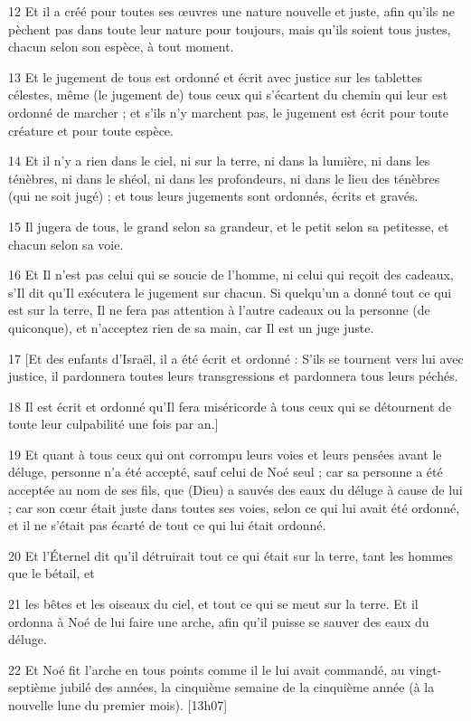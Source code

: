 \par 12 Et il a créé pour toutes ses œuvres une nature nouvelle et juste, afin qu'ils ne pèchent pas dans toute leur nature pour toujours, mais qu'ils soient tous justes, chacun selon son espèce, à tout moment.
\par 13 Et le jugement de tous est ordonné et écrit avec justice sur les tablettes célestes, même (le jugement de) tous ceux qui s'écartent du chemin qui leur est ordonné de marcher ; et s'ils n'y marchent pas, le jugement est écrit pour toute créature et pour toute espèce.
\par 14 Et il n'y a rien dans le ciel, ni sur la terre, ni dans la lumière, ni dans les ténèbres, ni dans le shéol, ni dans les profondeurs, ni dans le lieu des ténèbres (qui ne soit jugé) ; et tous leurs jugements sont ordonnés, écrits et gravés.
\par 15 Il jugera de tous, le grand selon sa grandeur, et le petit selon sa petitesse, et chacun selon sa voie.
\par 16 Et Il n'est pas celui qui se soucie de l'homme, ni celui qui reçoit des cadeaux, s'Il dit qu'Il exécutera le jugement sur chacun. Si quelqu'un a donné tout ce qui est sur la terre, Il ne fera pas attention à l'autre cadeaux ou la personne (de quiconque), et n'acceptez rien de sa main, car Il est un juge juste.
\par 17 [Et des enfants d'Israël, il a été écrit et ordonné : S'ils se tournent vers lui avec justice, il pardonnera toutes leurs transgressions et pardonnera tous leurs péchés.
\par 18 Il est écrit et ordonné qu'Il fera miséricorde à tous ceux qui se détournent de toute leur culpabilité une fois par an.]
\par 19 Et quant à tous ceux qui ont corrompu leurs voies et leurs pensées avant le déluge, personne n'a été accepté, sauf celui de Noé seul ; car sa personne a été acceptée au nom de ses fils, que (Dieu) a sauvés des eaux du déluge à cause de lui ; car son cœur était juste dans toutes ses voies, selon ce qui lui avait été ordonné, et il ne s'était pas écarté de tout ce qui lui était ordonné.
\par 20 Et l'Éternel dit qu'il détruirait tout ce qui était sur la terre, tant les hommes que le bétail, et
\par 21 les bêtes et les oiseaux du ciel, et tout ce qui se meut sur la terre. Et il ordonna à Noé de lui faire une arche, afin qu'il puisse se sauver des eaux du déluge.
\par 22 Et Noé fit l'arche en tous points comme il le lui avait commandé, au vingt-septième jubilé des années, la cinquième semaine de la cinquième année (à la nouvelle lune du premier mois). [13h07]
